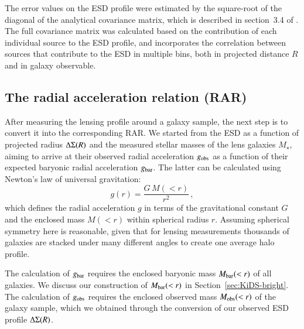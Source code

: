 \documentclass{aa}
\renewcommand{\Upsigma}{{\rm \Sigma}}
\renewcommand{\Updelta}{{\rm \Delta}}
\newcommand{\un}[1]{_{\rm #1}}
\begin{document}
The error values on the ESD profile were estimated by the square-root of the diagonal of the analytical covariance matrix, which is described in section~3.4 of \cite{viola2015}. The full covariance matrix was calculated based on the contribution of each individual source to the ESD profile, and incorporates the correlation between sources that contribute to the ESD in multiple bins, both in projected distance $R$ and in galaxy observable.


\subsection{The radial acceleration relation (RAR)}
\label{sec:Conversion}

After measuring the lensing profile around a galaxy sample, the next step is to convert it into the corresponding RAR. We started from the ESD as a function of projected radius $\Updelta\Upsigma(R)$ and the measured stellar masses of the lens galaxies $M_\star$, aiming to arrive at their observed radial acceleration $g\un{obs}$ as a function of their expected baryonic radial acceleration $g\un{bar}$. The latter can be calculated using Newton's law of universal gravitation:
\begin{equation}\label{eq:grav}
g(r) = \frac{G \, M(<r)}{r^2} \, ,
\end{equation}
which defines the radial acceleration $g$ in terms of the gravitational constant $G$ and the enclosed mass $M(<r)$ within spherical radius $r$. Assuming spherical symmetry here is reasonable, given that for lensing measurements thousands of galaxies are stacked under many different angles to create one average halo profile. 

The calculation of $g\un{bar}$ requires the enclosed baryonic mass $M\un{bar}(<r)$ of all galaxies. We discuss our construction of $M\un{bar}(<r)$ in Section~\ref{sec:KiDS-bright}. The calculation of $g\un{obs}$ requires the enclosed observed mass $M\un{obs}(<r)$ of the galaxy sample, which we obtained through the conversion of our observed ESD profile \mbox{$\Updelta\Upsigma(R)$}.
\end{document}
